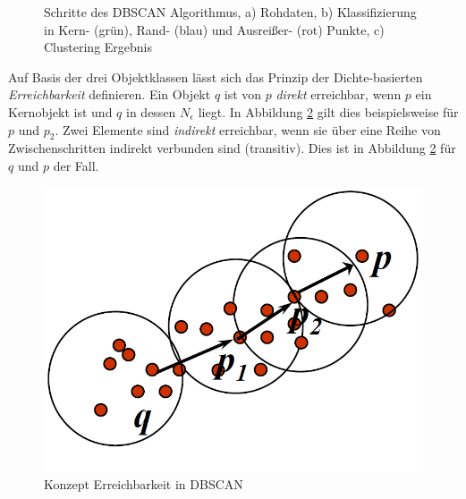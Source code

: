 \begin{figure}[H]
    \centering
    \caption[Schritte des DBSCAN Algorithmus]
            {Schritte des DBSCAN Algorithmus, a) Rohdaten, b) Klassifizierung in Kern- (grün), Rand- (blau) und Ausreißer- (rot) Punkte, c) Clustering Ergebnis \cite[]{Gao2012}}
    \label{fig:grund_dbscan_clustering}
\end{figure}

Auf Basis der drei Objektklassen lässt sich das Prinzip der Dichte-basierten \textit{Erreichbarkeit} definieren.
Ein Objekt $q$ ist von $p$ \textit{direkt} erreichbar, wenn $p$ ein Kernobjekt ist und $q$ in dessen $N_{\epsilon}$ liegt.
In Abbildung \ref{fig:grund_dbscan_reachability} gilt dies beispielsweise für $p$ und $p_2$.
Zwei Elemente sind \textit{indirekt} erreichbar, wenn sie über eine Reihe von Zwischenschritten indirekt
verbunden sind (transitiv). Dies ist in Abbildung \ref{fig:grund_dbscan_reachability} für $q$ und $p$ der Fall.

\begin{figure}[H]
    \centering
    \includegraphics[width=0.32\linewidth]{resources/img/grundlagen/clustering_dbscan/reachability}
    \caption[Konzept Erreichbarkeit in DBSCAN]{Konzept Erreichbarkeit in DBSCAN \cite[]{Gao2012}}
    \label{fig:grund_dbscan_reachability}
\end{figure}

